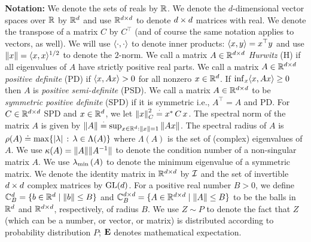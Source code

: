 \textbf{Notation:} We denote the sets of reals by $\mathbb{R}$. 
We denote the $d$-dimensional vector spaces over $\mathbb{R}$ by $\mathbb{R}^{d}$
and use $\mathbb{R}^{d \times d}$  to denote $d \times d$ matrices with real. 
We denote the transpose of a matrix $C$ by $C^\top$  
(and of course the same notation applies to vectors, as well). 
We will use $\langle\cdot,\cdot\rangle$ to denote inner products: $\langle x,y\rangle=x^\top y$
and use $\left\| x\right\| = \langle x,x\rangle^{1/2}$ to denote the $2$-norm.
We call a matrix $A\in \mathbb{R}^{d \times d}$  \emph{Hurwitz} (H) if all eigenvalues of $A$ have strictly positive real parts. 
We call a matrix $A\in \mathbb{R}^{d \times d}$ \emph{positive definite} (PD) if $\langle x,Ax\rangle >0$ for all nonzero $x \in \mathbb{R}^{d}$.
If $\inf_x \langle x,Ax\rangle\ge 0$ then $A$ is \emph{positive semi-definite} (PSD).
We call a matrix $A\in \mathbb{R}^{d \times d}$ to be \emph{symmetric positive definite} (SPD) if 
it is symmetric i.e., $A^\top=A$ and PD. 
For $C\in \mathbb{R}^{d \times d}$ SPD and $x\in \mathbb{R}^d$, we let $\left\| x\right\|^2_C\stackrel{\cdot}{=} x^*\, C \,x$.
The spectral norm of the matrix $A$ is given by $\left\| A\right\|\stackrel{\cdot}{=} \sup_{x\in \mathbb{R}^d:\left\| x\right\|=1} \left\| Ax\right\|$.  
The spectral radius of $A$ is $\rho(A)\doteq \max\{ |\lambda|\,:\, \lambda \in \Lambda(A) \}$ where $\Lambda(A)$ is the set of (complex) eigenvalues of $A$. 
We use $\kappa(A)=\| A\|\| A^{-1}\|$ to denote the condition number of a non-singular matrix $A$. 
We use $\lambda_{\min}\left(A\right)$ to denote the minimum eigenvalue of a symmetric matrix.
We denote the identity matrix in $\mathbb{R}^{d \times d}$ by $\mathcal{I}$ and the set of invertible $d \times d$ complex matrices by $\mathrm{GL}(d)$.
For a positive real number $B>0$, we define $\mathbb{C}^{d}_B=\{b\in \mathbb{R}^d\mid \left\| b\right\|\leq B\}$ and $\mathbb{C}^{d \times d}_B=\{A\in \mathbb{R}^{d \times d}\mid \left\| A\right\|\leq B\}$ to be the balls in $\mathbb{R}^d$ and $\mathbb{R}^{d\times d}$, respectively, of radius $B$.  
We use $Z\sim P$ to denote the fact that $Z$ (which can be a number, or vector, or matrix) is distributed according to probability distribution $P$; $\mathbf{E}$ denotes mathematical expectation. 
